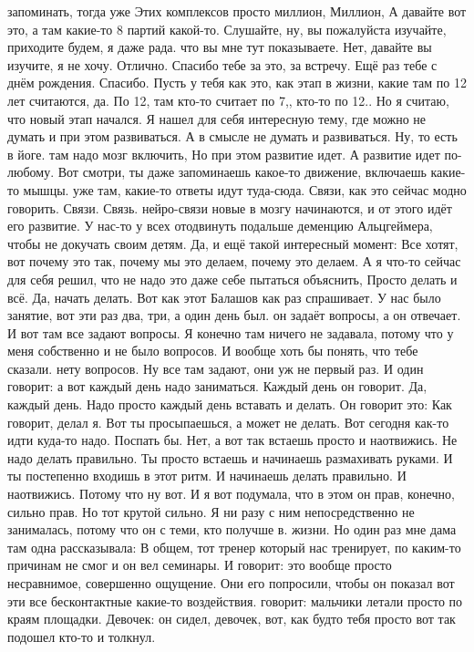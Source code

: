 запоминать, тогда уже Этих комплексов просто миллион, Миллион, А давайте вот это, а там какие-то 8 партий какой-то. Слушайте, ну, вы пожалуйста изучайте, приходите будем, я даже рада.
что вы мне тут показываете.
Нет, давайте вы изучите, я не хочу.
Отлично.
Спасибо тебе за это, за встречу.
Ещё раз тебе с днём рождения.
Спасибо.
Пусть у тебя как это, как этап в жизни, какие там по 12 лет считаются, да.
По 12, там кто-то считает по 7,, кто-то по 12..
Но я считаю, что новый этап начался. Я нашел для себя интересную тему, где можно не думать и при этом развиваться.
А в смысле не думать и развиваться.
Ну, то есть в йоге. там надо мозг включить, Но при этом развитие идет.
А развитие идет по-любому.
Вот смотри, ты даже запоминаешь какое-то движение, включаешь какие-то мышцы. уже там, какие-то ответы идут туда-сюда.
Связи, как это сейчас модно говорить.
Связи.
Связь.
нейро-связи новые в мозгу начинаются, и от этого идёт его развитие.
У нас-то у всех отодвинуть подальше деменцию Альцгеймера, чтобы не докучать своим детям.
Да, и ещё такой интересный момент: Все хотят, вот почему это так, почему мы это делаем, почему это делаем. А я что-то сейчас для себя решил, что не надо это даже себе пытаться объяснить, Просто делать и всё.
Да, начать делать.
Вот как этот Балашов как раз спрашивает.
У нас было занятие, вот эти раз два, три, а один день был. он задаёт вопросы, а он отвечает.
И вот там все задают вопросы.
Я конечно там ничего не задавала, потому что у меня собственно и не было вопросов.
И вообще хоть бы понять, что тебе сказали. нету вопросов.
Ну все там задают, они уж не первый раз.
И один говорит: а вот каждый день надо заниматься.
Каждый день он говорит.
Да, каждый день.
Надо просто каждый день вставать и делать.
Он говорит это:
Как говорит, делал я.
Вот ты просыпаешься, а может не делать.
Вот сегодня как-то идти куда-то надо.
Поспать бы.
Нет, а вот так встаешь просто и наотвижись.
Не надо делать правильно.
Ты просто встаешь и начинаешь размахивать руками.
И ты постепенно входишь в этот ритм.
И начинаешь делать правильно.
И наотвижись.
Потому что ну вот.
И я вот подумала, что в этом он прав, конечно, сильно прав.
Но тот крутой сильно.
Я ни разу с ним непосредственно не занималась, потому что он
с теми, кто получше в.
жизни.
Но один раз мне дама там одна рассказывала:
В общем, тот тренер который нас тренирует, по каким-то причинам не смог и он вел семинары.
И говорит: это вообще просто несравнимое, совершенно ощущение.
Они его попросили, чтобы он показал вот эти все бесконтактные какие-то воздействия.
говорит: мальчики летали просто по краям площадки.
Девочек: он сидел, девочек, вот, как будто тебя просто вот так подошел кто-то и толкнул.
